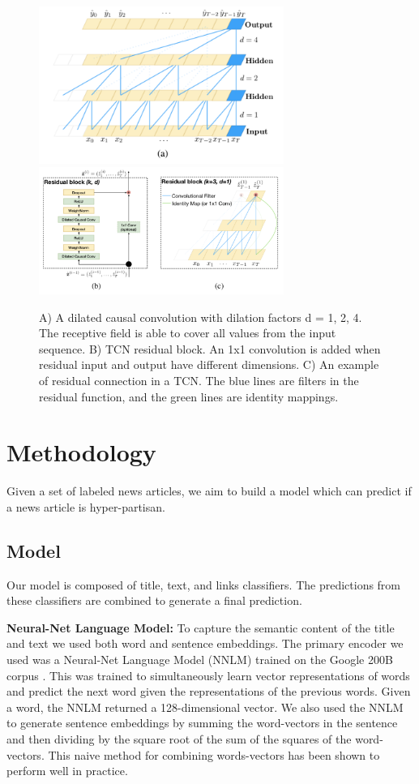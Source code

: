 \documentclass[11pt,a4paper]{article}
\begin{document}
\begin{figure}[ht]
\caption{A) A dilated causal convolution with dilation factors d = 1, 2, 4. The receptive field is able to cover all values from the input sequence. B) TCN residual block. An 1x1 convolution is added when residual input and output have different dimensions. C) An example of residual connection in a TCN. The blue lines are filters in the residual function, and the green lines are identity mappings.}
\includegraphics[width=8cm]{images/TCNN1.png}
\includegraphics[width=8cm]{images/TCNN2.png}
\end{figure}

\section{Methodology}

Given a set of labeled news articles, we aim to build a model which can predict if a news article is hyper-partisan.

\subsection{Model}

Our model is composed of title, text, and links classifiers. The predictions from these classifiers are combined to generate a final prediction.

\textbf{Neural-Net Language Model:} To capture the semantic content of the title and text we used both word and sentence embeddings. The primary encoder we used was a Neural-Net Language Model (NNLM) trained on the Google 200B corpus \citep{Bengio:2003:NPL:944919.944966}. This was trained to simultaneously learn vector representations of words and predict the next word given the representations of the previous words. Given a word, the NNLM returned a 128-dimensional vector. We also used the NNLM to generate sentence embeddings by summing the word-vectors in the sentence and then dividing by the square root of the sum of the squares of the word-vectors. This naive method for combining words-vectors has been shown to perform well in practice.
\end{document}
